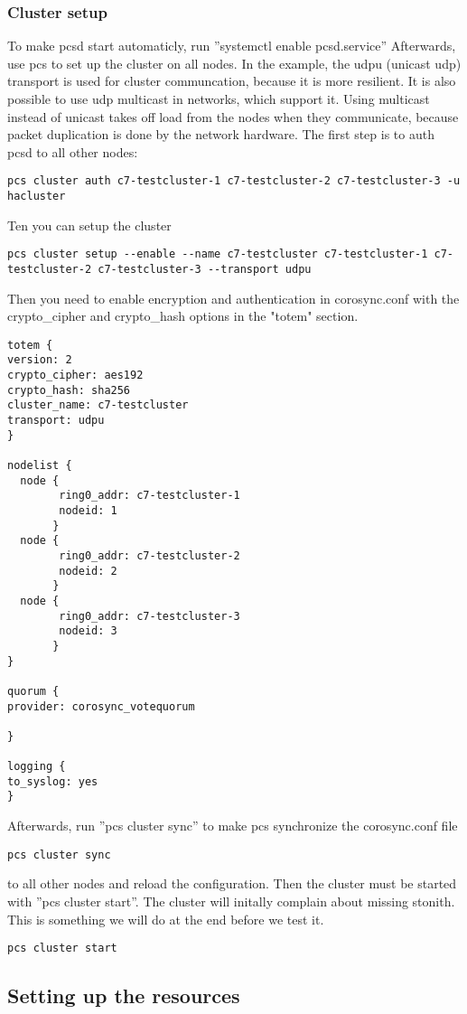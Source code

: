 \subsubsection{Cluster setup}
To make pcsd start automaticly, run ''systemctl enable pcsd.service''
Afterwards, use pcs to set up the cluster on all nodes. 
In the example, the udpu (unicast udp) transport is used for cluster communcation, because it is more resilient.
It is also possible to use udp multicast in networks, which support it. Using multicast
instead of unicast takes off load from the nodes when they communicate, because packet duplication is done by the network hardware.
The first step is to auth pcsd to all other nodes:
\begin{lstlisting}
pcs cluster auth c7-testcluster-1 c7-testcluster-2 c7-testcluster-3 -u hacluster
\end{lstlisting}
Ten you can setup the cluster
\begin{lstlisting}
pcs cluster setup --enable --name c7-testcluster c7-testcluster-1 c7-testcluster-2 c7-testcluster-3 --transport udpu
\end{lstlisting}
Then you need to enable encryption and authentication in corosync.conf with the crypto_cipher and crypto_hash
options in the "totem" section.
\begin{lstlisting}
totem {
version: 2
crypto_cipher: aes192
crypto_hash: sha256
cluster_name: c7-testcluster
transport: udpu
}

nodelist {
  node {
        ring0_addr: c7-testcluster-1
        nodeid: 1
       }
  node {
        ring0_addr: c7-testcluster-2
        nodeid: 2
       }
  node {
        ring0_addr: c7-testcluster-3
        nodeid: 3
       }
}

quorum {
provider: corosync_votequorum

}

logging {
to_syslog: yes
}
\end{lstlisting}
Afterwards, run ''pcs cluster sync'' to make pcs synchronize the corosync.conf file
\begin{lstlisting}
pcs cluster sync
\end{lstlisting}
to all other nodes and reload the configuration.
Then the cluster must be started with ''pcs cluster start''.
The cluster will initally complain about missing stonith. This is something we will do at the end
before we test it.
\begin{lstlisting}
pcs cluster start
\end{lstlisting}
\subsection{Setting up the resources}

